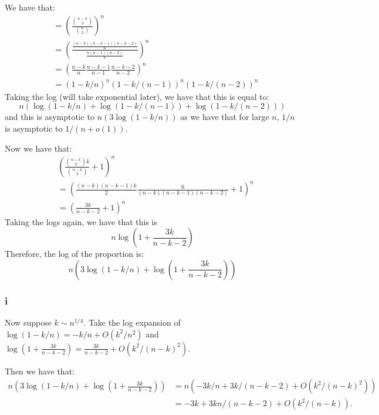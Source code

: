 \documentclass[]{article}
\theoremstyle{definition}
\numberwithin{theorem}{section}
\numberwithin{equation}{section}
\begin{document}
We have that:
\begin{align*}
	&= \left(\frac{\binom{n-k}{3}}{\binom{n}{3}}\right)^n\\
	&= \left( \frac{\frac{(n-k)(n-k - 1)(n - k - 2)}{6}}{\frac{n(n-1)(n-2)}{6}}  \right)^n\\
	&= \left(\frac{n-k}{n} \frac{n-k - 1}{n - 1} \frac{n - k - 2}{n - 2}\right)^n\\
	&= \left(1 - k/n\right)^n \left(1 - k/(n - 1)\right)^n \left(1 - k/(n-2)\right)^n
\end{align*}
Taking the log (will take exponential later), we have that this is equal to:
\begin{equation}
	n \left( \log(1 - k/n) +  \log(1 - k/(n-1)) + \log(1 - k/(n-2)) \right)
\end{equation}
and this is asymptotic to 
$n \left(3 \log(1 - k/n)\right)$ as we have that for large $n$, $1/n$ is asymptotic to $1/(n + o(1))$.

Now we have that:
\begin{align*}
	&\left(\frac{\binom{n-k}{2} k}{\binom{n-k}{3}} + 1\right)^n\\
	&= \left(\frac{(n-k)(n - k - 1)k}{2} \frac{6}{(n - k)(n - k - 1)(n - k - 2)} + 1\right)^n\\
	&= \left(\frac{3k}{n - k - 2} + 1\right)^n
\end{align*}
Taking the logs again, we have that this is
\begin{equation}
	n \log(1 + \frac{3k}{n - k - 2})
\end{equation}
Therefore, the log of the proportion is:
\begin{equation}
	n \left( 3 \log(1 - k/n) + \log\left(1 + \frac{3k}{n - k - 2}\right)\right)
\end{equation}

\subsubsection{i}
Now suppose $k \sim n^{1/4}$.
Take the log expansion of
$\log(1 - k/n) = -k/n + O(k^2/n^2)$ and $\log\left(1 + \frac{3k}{n - k - 2}\right) = \frac{3k}{n - k - 2} + O(k^2/(n- k)^2)$. 

Then we have that:
\begin{align*}
	n \left( 3 \log(1 - k/n) + \log\left(1 + \frac{3k}{n - k - 2}\right)\right) &= n \left(- 3k/n + 3k/(n - k - 2) + O(k^2/(n - k)^2)\right) \\
	&= -3k + 3kn/(n - k - 2) + O(k^2/(n - k)).
\end{align*}
\end{document}
